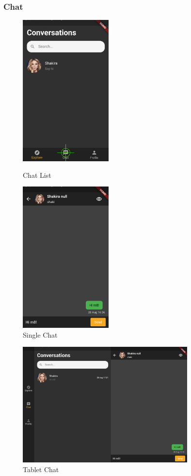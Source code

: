 \documentclass{article}
\begin{document}
\subsubsection{Chat}
\begin{figure}[!htb]
	\centering
	\begin{minipage}{.45\textwidth}
		\centering
		\includegraphics[height=7.7cm,keepaspectratio]{assets/images/ui/chat/10-chat-screen.png}
		\caption{Chat List}
	\end{minipage}\quad
	\begin{minipage}{.45\textwidth}
		\centering
		\includegraphics[height=7.7cm,keepaspectratio]{assets/images/ui/chat/13-send-a-message-sent.png}
		\caption{Single Chat}
	\end{minipage}
\end{figure}
\begin{figure}[!htb]
	\centering
	\includegraphics[width=0.8\textwidth]{assets/images/ui/chat/tablet-chat.png}
	\caption{Tablet Chat}
\end{figure}
\end{document}
